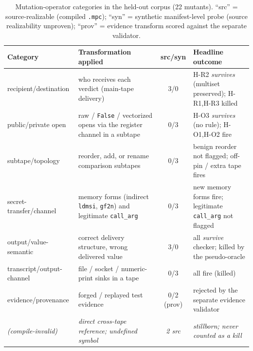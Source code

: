 \documentclass[conference]{IEEEtran}
\newcommand{\code}[1]{\texttt{\small #1}}
\newcommand{\callarg}{\code{call\_arg}}
\begin{document}
\begin{table}[t]
\centering\footnotesize\renewcommand{\arraystretch}{1.2}
\caption{Mutation-operator categories in the held-out corpus (22 mutants). ``src'' =
source-realizable (compiled \code{.mpc}); ``syn'' = synthetic manifest-level probe (source
realizability unproven); ``prov'' = evidence transform scored against the separate validator.}
\label{tab:operators}
\begin{tabularx}{\textwidth}{@{}l X c X@{}}
\toprule
\textbf{Category} & \textbf{Transformation applied} & \textbf{src/syn} & \textbf{Headline outcome} \\
\midrule
recipient/destination & who receives each verdict (main-tape delivery) & 3/0 & H-R2 \emph{survives} (multiset preserved); H-R1,H-R3 killed \\
public/private open & raw / \code{False} / vectorized opens via the register channel in a subtape & 0/3 & H-O3 \emph{survives} (no rule); H-O1,H-O2 fire \\
subtape/topology & reorder, add, or rename comparison subtapes & 0/3 & benign reorder not flagged; off-pin / extra tape fires \\
secret-transfer/channel & memory forms (indirect \code{ldmsi}, \code{gf2n}) and legitimate \callarg{} & 0/3 & new memory forms fire; legitimate \callarg{} not flagged \\
output/value-semantic & correct delivery structure, wrong delivered value & 3/0 & all \emph{survive} checker; killed by the pseudo-oracle \\
transcript/output-channel & file / socket / numeric-print sinks in a tape & 0/3 & all fire (killed) \\
evidence/provenance & forged / replayed test evidence & 0/2 (prov) & rejected by the separate evidence validator \\
\midrule
\emph{(compile-invalid)} & \emph{direct cross-tape reference; undefined symbol} & \emph{2 src} & \emph{stillborn; never counted as a kill} \\
\bottomrule
\end{tabularx}
\end{table}
\end{document}
